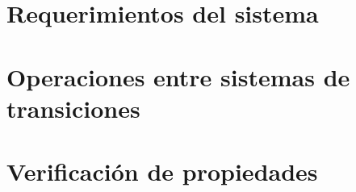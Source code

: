 \section{Requerimientos del sistema}


\section{Operaciones entre sistemas de transiciones}


\section{Verificación de propiedades}


